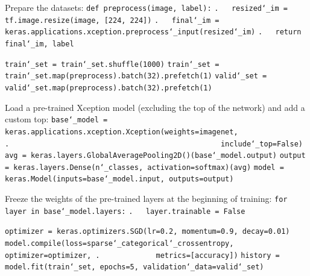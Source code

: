 Prepare the datasets:\newline
\texttt{def preprocess(image, label):}\newline
\texttt{.~~~resized\char`_im = tf.image.resize(image, [224, 224])}\newline
\texttt{.~~~final\char`_im = keras.applications.xception.preprocess\char`_input(resized\char`_im)}\newline
\texttt{.~~~return final\char`_im, label}

\texttt{train\char`_set = train\char`_set.shuffle(1000)}\newline
\texttt{train\char`_set = train\char`_set.map(preprocess).batch(32).prefetch(1)}\newline
\texttt{valid\char`_set = valid\char`_set.map(preprocess).batch(32).prefetch(1)}\newline

Load a pre-trained Xception model (excluding the top of the network) and add a custom top:\newline
\texttt{base\char`_model = keras.applications.xception.Xception(weights=\textquotesingle imagenet\textquotesingle,\newline
.~~~~~~~~~~~~~~~~~~~~~~~~~~~~~~~~~~~~~~~~~~~~~~~~~include\char`_top=False)}\newline
\texttt{avg = keras.layers.GlobalAveragePooling2D()(base\char`_model.output)}\newline
\texttt{output = keras.layers.Dense(n\char`_classes, activation=\textquotesingle softmax\textquotesingle)(avg)}\newline
\texttt{model = keras.Model(inputs=base\char`_model.input, outputs=output)}

Freeze the weights of the pre-trained layers at the beginning of training:\newline
\texttt{for layer in base\char`_model.layers:}\newline
\texttt{.~~~layer.trainable = False}

\texttt{optimizer = keras.optimizers.SGD(lr=0.2, momentum=0.9, decay=0.01)}\newline
\texttt{model.compile(loss=\textquotesingle sparse\char`_categorical\char`_crossentropy\textquotesingle, optimizer=optimizer,\newline
.~~~~~~~~~~~~~metrics=[\textquotesingle accuracy\textquotesingle])}\newline
\texttt{history = model.fit(train\char`_set, epochs=5, validation\char`_data=valid\char`_set)}\newline

